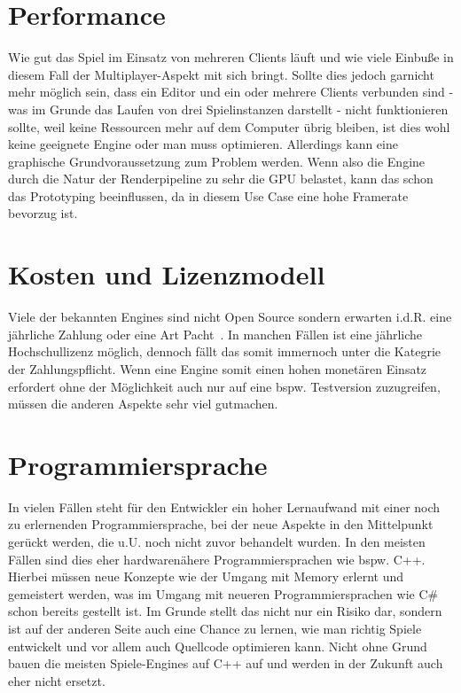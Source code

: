 \section{Performance}
Wie gut das Spiel im Einsatz von mehreren Clients läuft und wie viele Einbuße in diesem Fall der Multiplayer-Aspekt mit sich bringt. Sollte dies jedoch garnicht mehr möglich sein, dass ein Editor und ein oder mehrere Clients verbunden sind - was im Grunde das Laufen von drei Spielinstanzen darstellt - nicht funktionieren sollte, weil keine Ressourcen mehr auf dem Computer übrig bleiben, ist dies wohl keine geeignete Engine oder man muss optimieren. 
Allerdings kann eine graphische Grundvoraussetzung zum Problem werden. Wenn also die Engine durch die Natur der Renderpipeline zu sehr die GPU belastet, kann das schon das Prototyping beeinflussen, da in diesem Use Case eine hohe Framerate bevorzug ist.

\section{Kosten und Lizenzmodell}
Viele der bekannten Engines sind nicht Open Source sondern erwarten i.d.R. eine jährliche Zahlung oder eine Art Pacht~. In manchen Fällen ist eine jährliche Hochschullizenz möglich, dennoch fällt das somit immernoch unter die Kategrie der Zahlungspflicht. 
Wenn eine Engine somit einen hohen monetären Einsatz erfordert ohne der Möglichkeit auch nur auf eine bspw. Testversion zuzugreifen, müssen die anderen Aspekte sehr viel gutmachen.
\newpage

\section{Programmiersprache}
In vielen Fällen steht für den Entwickler ein hoher Lernaufwand mit einer noch zu erlernenden Programmiersprache, bei der neue Aspekte in den Mittelpunkt gerückt werden, die u.U. noch nicht zuvor behandelt wurden. In den meisten Fällen sind dies eher hardwarenähere Programmiersprachen wie bspw. C++. Hierbei müssen neue Konzepte wie der Umgang mit Memory erlernt und gemeistert werden, was im Umgang mit neueren Programmiersprachen wie C\# schon bereits gestellt ist. 
Im Grunde stellt das nicht nur ein Risiko dar, sondern ist auf der anderen Seite auch eine Chance zu lernen, wie man richtig Spiele entwickelt und vor allem auch Quellcode optimieren kann. Nicht ohne Grund bauen die meisten Spiele-Engines auf C++ auf und werden in der Zukunft auch eher nicht ersetzt.  


